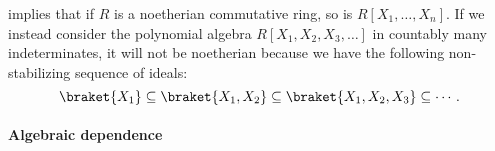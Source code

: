 
\begin{example}\label{ex:countable_indeterminates_non_noetherian}
   implies that if \( R \) is a noetherian commutative ring, so is \( R[X_1, \ldots, X_n] \). If we instead consider the polynomial algebra \( R[X_1, X_2, X_3, \ldots] \) in countably many indeterminates, it will not be noetherian because we have the following non-stabilizing sequence of ideals:
  \begin{equation*}
    \braket{ X_1 } \subseteq \braket{ X_1, X_2 } \subseteq \braket{ X_1, X_2, X_3 } \subseteq \cdots.
  \end{equation*}
\end{example}

\paragraph{Algebraic dependence}

